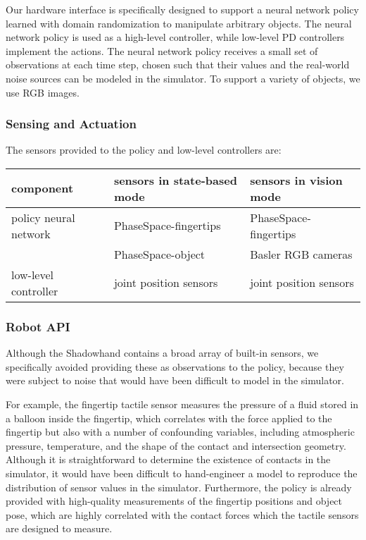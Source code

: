 

Our hardware interface is specifically designed to support a neural network policy learned with domain randomization to manipulate arbitrary objects. The neural network policy is used as a high-level controller, while low-level PD controllers implement the actions. The neural network policy receives a small set of observations at each time step, chosen such that their values and the real-world noise sources can be modeled in the simulator. To support a variety of objects, we use RGB images.

\subsubsection{Sensing and Actuation}


The sensors provided to the policy and low-level controllers are:
\begin{center}
    \scriptsize
    \renewcommand{\arraystretch}{1.3}
    \begin{tabular}{@{}lll@{}}
        \toprule
        \textbf{component} & \textbf{sensors in state-based mode} & \textbf{sensors in vision mode} \\ \midrule
        policy neural network &
            PhaseSpace-fingertips & PhaseSpace-fingertips\\
          & PhaseSpace-object & Basler RGB cameras \\
        low-level controller &
            joint position sensors & 
                joint position sensors \\
    \bottomrule\end{tabular}
\end{center}



\subsubsection{Robot API}


Although the Shadowhand contains a broad array of built-in sensors, we specifically avoided providing these as observations to the policy, because they were subject to noise that would have been difficult to model in the simulator.


For example, the fingertip tactile sensor measures the pressure of a fluid stored in a balloon inside the fingertip, which correlates with the force applied to the fingertip but also with a number of confounding variables, including atmospheric pressure, temperature, and the shape of the contact and intersection geometry. Although it is straightforward to determine the existence of contacts in the simulator, it would have been difficult to hand-engineer a model to reproduce the distribution of sensor values in the simulator. Furthermore, the policy is already provided with high-quality measurements of the fingertip positions and object pose, which are highly correlated with the contact forces which the tactile sensors are designed to measure.

